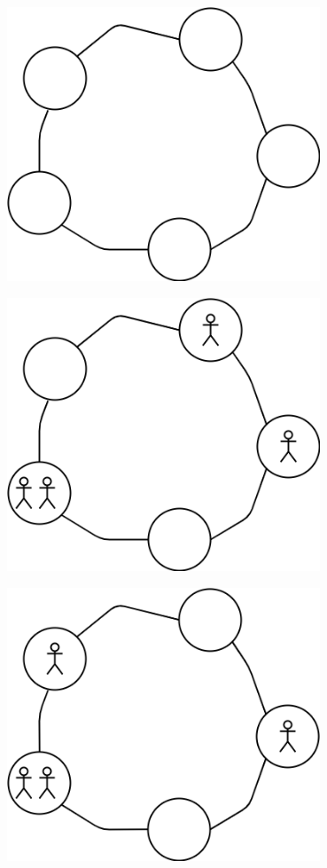 \documentclass{beamer}
\begin{document}
\begin{frame}
	\begin{center}
		\includegraphics[width=0.7\textwidth]{images/init0.png}
	\end{center}
\end{frame}
\begin{frame}
	\begin{center}
		\includegraphics[width=0.7\textwidth]{images/init1.png}
	\end{center}
\end{frame}
\begin{frame}
	\begin{center}
		\includegraphics[width=0.7\textwidth]{images/init2.png}
	\end{center}
\end{frame}
\end{document}
